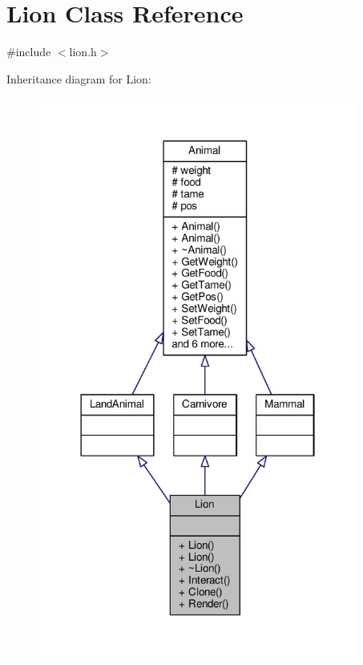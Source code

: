 \hypertarget{classLion}{}\section{Lion Class Reference}
\label{classLion}


{\ttfamily \#include $<$lion.\+h$>$}



Inheritance diagram for Lion\+:
\nopagebreak
\begin{figure}[H]
\begin{center}
\leavevmode
\includegraphics[width=298pt]{classLion__inherit__graph}
\end{center}
\end{figure}


